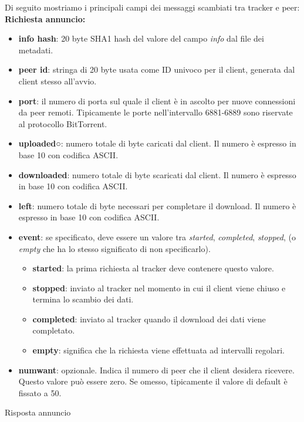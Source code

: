 \documentclass[a4]{book}
\begin{document}
Di seguito mostriamo i principali campi dei messaggi scambiati tra tracker e peer:\newline\newline
\textbf{Richiesta annuncio:}
\begin{itemize}
	\item \textbf{info hash}: 20 byte SHA1 hash del valore del campo \textit{info} dal file dei metadati.
	\item \textbf{peer id}: stringa di 20 byte usata come ID univoco per il client, generata dal client stesso all'avvio.
	\item \textbf{port}: il numero di porta sul quale il client è in ascolto per nuove connessioni da peer remoti. Tipicamente le porte nell'intervallo 6881-6889 sono riservate al protocollo BitTorrent.
	\item \textbf{uploaded}○: numero totale di byte caricati dal client. Il numero è espresso in base 10 con codifica ASCII.
	\item \textbf{downloaded}: numero totale di byte scaricati dal client.  Il numero è espresso in base 10 con codifica ASCII.
	\item \textbf{left}: numero totale di byte necessari per completare il download. Il numero è espresso in base 10 con codifica ASCII.
	\item \textbf{event}: se specificato, deve essere un valore tra \textit{started}, \textit{completed}, \textit{stopped}, (o \textit{empty} che ha lo stesso significato di non specificarlo).
	\begin{itemize}
			\item \textbf{started}: la prima richiesta al tracker deve contenere questo valore.
			\item \textbf{stopped}: inviato al tracker nel momento in cui il client viene chiuso e termina lo scambio dei dati.
			\item \textbf{completed}: inviato al tracker quando il download dei dati viene completato.
			\item \textbf{empty}: significa che la richiesta viene effettuata ad intervalli regolari.
	\end{itemize}
	\item \textbf{numwant}: opzionale. Indica il numero di peer che il client desidera ricevere. Questo valore può essere zero. Se omesso, tipicamente il valore di default è fissato a 50.\newline		
\end{itemize}
Risposta annuncio
\end{document}
